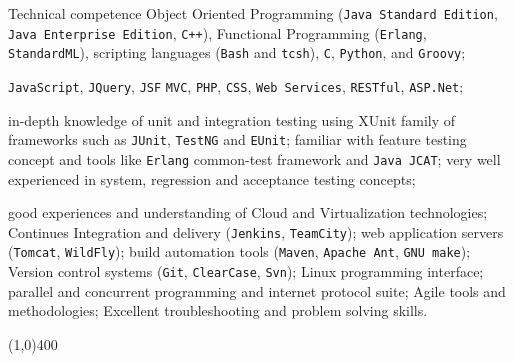 \documentclass{resume}
\begin{document}
\begin{category}{Technical competence}
\hspace{1 mm}Object Oriented Programming 
(\texttt{Java Standard Edition}, \texttt{Java Enterprise Edition}, \texttt{C++}), 
Functional Programming (\texttt{Erlang}, \texttt{StandardML}), 
scripting languages (\texttt{Bash} and \texttt{tcsh}), \texttt{C}, \texttt{Python}, 
and \texttt{Groovy};

\hspace{1 mm}\texttt{JavaScript}, \texttt{JQuery}, \texttt{JSF} 
\texttt{MVC}, \texttt{PHP}, \texttt{CSS}, \texttt{Web Services}, \texttt{RESTful}, \texttt{ASP.Net};


\hspace{1 mm}in-depth knowledge of unit and integration 
testing using XUnit family of frameworks such as \texttt{JUnit}, \texttt{TestNG} and \texttt{EUnit}; 
familiar with feature testing concept and tools like \texttt{Erlang} common-test 
framework and \texttt{Java JCAT}; very well experienced in system, regression and acceptance testing concepts;

\hspace{1 mm}good experiences and understanding of Cloud and Virtualization technologies;
Continues Integration and delivery (\texttt{Jenkins}, \texttt{TeamCity});
web application servers (\texttt{Tomcat}, \texttt{WildFly}); 
build automation tools (\texttt{Maven}, \texttt{Apache Ant}, \texttt{GNU make}); 
Version control systems (\texttt{Git}, \texttt{ClearCase}, \texttt{Svn});
Linux programming interface; parallel and concurrent programming and internet protocol suite;
Agile tools and methodologies; Excellent troubleshooting and problem solving skills.

\end{category}

\begin{center}
\line(1,0){400}
\end{center}
\end{document}
